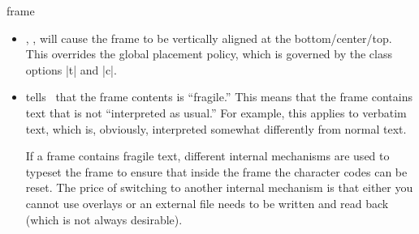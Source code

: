 \begin{environment}{{frame}%
    }
\begin{frame}[<+->][plain]
\begin{frame}[plain]
\begin{itemize}
    The use of this  option \emph{evil}. In a (good) presentation you
    prepare each slide carefully and think twice before putting something
    on a certain slide rather than on some different slide. Using the
    |allowframebreaks| option invites the creation of horrible, endless
    presentations that resemble more a ``paper projected on the wall''
    than a presentation. Nevertheless, the option does have its
    uses. Most noticeably, it can be convenient for automatically
    splitting bibliographies or long equations.

    \example
\begin{verbatim}
\begin{frame}[allowframebreaks]{References}
  \begin{thebibliography}{XX}

  \bibitem...
  \bibitem...
    ...
  \bibitem...
  \end{thebibliography}
\end{frame}
\end{verbatim}
    \example
\begin{verbatim}
\begin{frame}[allowframebreaks,allowdisplaybreaks]{A Long Equation}
  \begin{align}
    \zeta(2) &= 1 + 1/4 + 1/9 + \cdots \\
    &= ... \\
    ...
    &= \pi^2/6.
  \end{align}
\end{frame}
\end{verbatim}
  \item
    , ,  will cause the frame
    to be vertically aligned at the bottom/center/top. This overrides
    the global placement policy, which is governed by the class
    options |t| and |c|.
  \item
     tells \beamer\
    that the frame contents is ``fragile.'' This means that the frame
    contains text that is not ``interpreted as usual.'' For example,
    this applies to verbatim text, which is, obviously, interpreted
    somewhat differently from normal text.

    If a frame contains fragile text, different internal mechanisms
    are used to typeset the frame to ensure that inside the frame the
    character codes can be reset. The price of switching to another
    internal mechanism is that either you cannot use overlays or an
    external file needs to be written and read back (which is not
    always desirable).


\end{itemize}
\end{frame}
\end{frame}
\end{environment}
